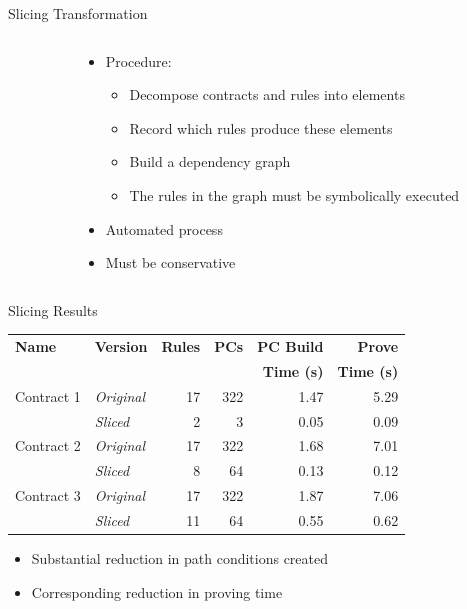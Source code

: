 \documentclass[12pt, handout]{beamer}
\begin{document}
\begin{frame}{Slicing Transformation}
\begin{columns}[T]
\begin{column}[T]{0.45\textwidth}
 \end{column}
     \begin{column}[T]{0.55\textwidth}
     \begin{itemize}[<+->]
\item Procedure:
\begin{itemize}[<+->]
\item Decompose contracts and rules into elements
\item Record which rules produce these elements
\item Build a dependency graph
\item The rules in the graph must be symbolically executed
\end{itemize}
\item Automated process
\item Must be conservative
\end{itemize}
 \end{column}
 \end{columns}
\end{frame}

\begin{frame}{Slicing Results}

\begin{center}

\begin{tabular}{l l | r| r | r | r }
\textbf{Name} & \textbf{Version} & \textbf{Rules} & \textbf{PCs} & \textbf{PC Build}   & \textbf{Prove}\\
& & & &\textbf{Time (s)}&\textbf{Time (s)}\\\hline\hline
Contract 1& \textit{Original} & 17 & 322 & 1.47 & 5.29 \\
& \textit{Sliced}& 2 & 3 & 0.05 & 0.09 \\\hline

Contract 2& \textit{Original} & 17 & 322 & 1.68 & 7.01 \\
& \textit{Sliced}& 8 & 64 & 0.13 & 0.12 \\\hline

Contract 3 & \textit{Original} & 17 & 322 & 1.87 & 7.06\\
& \textit{Sliced}& 11 & 64 & 0.55 & 0.62 \\\hline
\end{tabular}
\end{center}

\begin{itemize}
\item Substantial reduction in path conditions created
\item Corresponding reduction in proving time
\end{itemize}
\end{frame}
\end{document}

